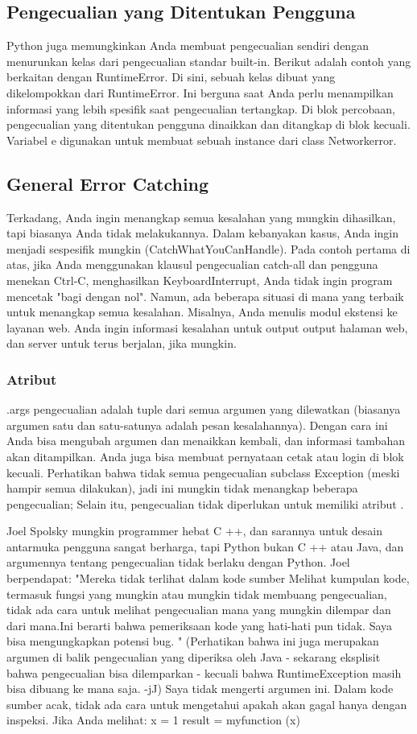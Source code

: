 \subsection{Pengecualian yang Ditentukan Pengguna}
Python juga memungkinkan Anda membuat pengecualian sendiri dengan menurunkan kelas dari pengecualian standar built-in.
Berikut adalah contoh yang berkaitan dengan RuntimeError. Di sini, sebuah kelas dibuat yang dikelompokkan dari RuntimeError. Ini berguna saat Anda perlu menampilkan informasi yang lebih spesifik saat pengecualian tertangkap.
Di blok percobaan, pengecualian yang ditentukan pengguna dinaikkan dan ditangkap di blok kecuali. Variabel e digunakan untuk membuat sebuah instance dari class Networkerror.

\subsection{General Error Catching}
Terkadang, Anda ingin menangkap semua kesalahan yang mungkin dihasilkan, tapi biasanya Anda tidak melakukannya. Dalam kebanyakan kasus, Anda ingin menjadi sespesifik mungkin (CatchWhatYouCanHandle). Pada contoh pertama di atas, jika Anda menggunakan klausul pengecualian catch-all dan pengguna menekan Ctrl-C, menghasilkan KeyboardInterrupt, Anda tidak ingin program mencetak "bagi dengan nol".
Namun, ada beberapa situasi di mana yang terbaik untuk menangkap semua kesalahan.
Misalnya, Anda menulis modul ekstensi ke layanan web. Anda ingin informasi kesalahan untuk output output halaman web, dan server untuk terus berjalan, jika mungkin. 
\subsubsection{Atribut}
.args pengecualian adalah tuple dari semua argumen yang dilewatkan (biasanya argumen satu dan satu-satunya adalah pesan kesalahannya). Dengan cara ini Anda bisa mengubah argumen dan menaikkan kembali, dan informasi tambahan akan ditampilkan. Anda juga bisa membuat pernyataan cetak atau login di blok kecuali.
Perhatikan bahwa tidak semua pengecualian subclass Exception (meski hampir semua dilakukan), jadi ini mungkin tidak menangkap beberapa pengecualian; Selain itu, pengecualian tidak diperlukan untuk memiliki atribut .

Joel Spolsky mungkin programmer hebat C ++, dan sarannya untuk desain antarmuka pengguna sangat berharga, tapi Python bukan C ++ atau Java, dan argumennya tentang pengecualian tidak berlaku dengan Python.
Joel berpendapat: 
"Mereka tidak terlihat dalam kode sumber Melihat kumpulan kode, termasuk fungsi yang mungkin atau mungkin tidak membuang pengecualian, tidak ada cara untuk melihat pengecualian mana yang mungkin dilempar dan dari mana.Ini berarti bahwa pemeriksaan kode yang hati-hati pun tidak. Saya bisa mengungkapkan potensi bug. "
(Perhatikan bahwa ini juga merupakan argumen di balik pengecualian yang diperiksa oleh Java - sekarang eksplisit bahwa pengecualian bisa dilemparkan - kecuali bahwa RuntimeException masih bisa dibuang ke mana saja. -jJ)
Saya tidak mengerti argumen ini. Dalam kode sumber acak, tidak ada cara untuk mengetahui apakah akan gagal hanya dengan inspeksi. Jika Anda melihat:
x = 1 
result = myfunction (x) 


